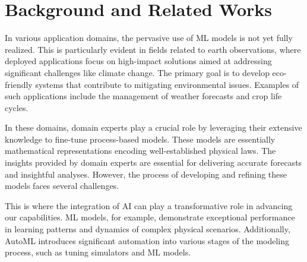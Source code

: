 \chapter{Background and Related Works}
\label{physics-aware-chap:background}
In various application domains, the pervasive use of ML models is not yet fully realized.
This is particularly evident in fields related to earth observations, where deployed applications focus on high-impact solutions aimed at addressing significant challenges like climate change. The primary goal is to develop eco-friendly systems that contribute to mitigating environmental issues. Examples of such applications include the management of weather forecasts and crop life cycles.

In these domains, domain experts play a crucial role by leveraging their extensive knowledge to fine-tune process-based models. These models are essentially mathematical representations encoding well-established physical laws. The insights provided by domain experts are essential for delivering accurate forecasts and insightful analyses. However, the process of developing and refining these models faces several challenges.



This is where the integration of AI can play a transformative role in advancing our capabilities.
ML models, for example, demonstrate exceptional performance in learning patterns and dynamics of complex physical scenarios.
Additionally, AutoML introduces significant automation into various stages of the modeling process, such as tuning simulators and ML models.

